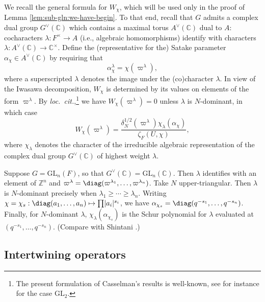 We recall the general formula for $W_\chi$, which will be used only in the proof of Lemma \ref{lem:sub-gln:we-have-begin}.  To that end, recall that $G$ admits a complex dual group $G^\vee(\mathbb{C})$ which contains a maximal torus $A^\vee(\mathbb{C})$ dual to $A$: cocharacters $\lambda : F^\times \rightarrow A$ (i.e., algebraic homomorphisms) identify with characters $\lambda : A^\vee(\mathbb{C}) \rightarrow \mathbb{C}^\times$.  Define the (representative for the) Satake parameter $\alpha_\chi \in A^\vee(\mathbb{C})$ by requiring that
\begin{equation*}
  \alpha_\chi^\lambda = \chi(\varpi^\lambda),
\end{equation*}
where a superscripted $\lambda$ denotes the image under the (co)character $\lambda$.  In view of the Iwasawa decomposition, $W_\chi$ is determined by its values on elements of the form $\varpi^{\lambda}$.  By \emph{loc.\ cit.},\footnote{ The present formulation of Casselman's results is well-known, see for instance \cite[p.\ 504-505]{MR1431508} for the case $\mathrm{GL}_2$.} we have $W_\chi(\varpi^\lambda) = 0$ unless $\lambda$ is $N$-dominant, in which case
\begin{equation*}
  W_\chi(\varpi^\lambda) = \frac{\delta_N^{1/2}(\varpi^\lambda) \chi_\lambda(\alpha_\chi)}{\zeta_F(U, \chi)},
\end{equation*}
where $\chi_\lambda$ denotes the character of the irreducible algebraic representation of the complex dual group $G^\vee(\mathbb{C})$ of highest weight $\lambda$.

\begin{example}\label{example:cuhi8y36c4}
  Suppose $G = \mathrm{GL}_n(F)$, so that $G^\vee(\mathbb{C}) = \mathrm{GL}_n(\mathbb{C})$.  Then $\lambda$ identifies with an element of $\mathbb{Z}^n$ and $\varpi^\lambda = \diag(\varpi^{\lambda_1}, \dotsc, \varpi^{\lambda_n})$.  Take $N$ upper-triangular.  Then $\lambda$ is $N$-dominant precisely when $\lambda_1 \geq \dotsb \geq \lambda_n$.  Writing $\chi = \chi_s : \diag(a_1,\dotsc,a_n) \mapsto \prod \lvert a_i \rvert^{s_i}$, we have $\alpha_{\chi_s} = \diag(q^{- s_1}, \dotsc, q^{- s_n})$.  Finally, for $N$-dominant $\lambda$, $\chi_\lambda(\alpha_{\chi_s})$ is the Schur polynomial for $\lambda$ evaluated at $(q^{- s_1}, \dotsc, q^{- s_n})$.  (Compare with Shintani \cite{MR407208}.)
\end{example}

\subsection{Intertwining operators}\label{sec:local-intertw-oper-four}

